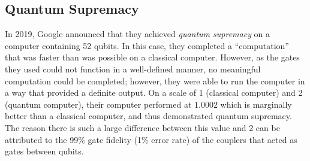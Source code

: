 \subsection{Quantum Supremacy}
In 2019, Google announced that they achieved \emph{quantum supremacy} on a computer containing 52 qubits. In this case, they completed a ``computation'' that was faster than was possible on a classical computer. However, as the gates they used could not function in a well-defined manner, no meaningful computation could be completed; however, they were able to run the computer in a way that provided a definite output. On a scale of 1 (classical computer) and 2 (quantum computer), their computer performed at \(1.0002\) which is marginally better than a classical computer, and thus demonstrated quantum supremacy. The reason there is such a large difference between this value and 2 can be attributed to the 99\% gate fidelity (1\% error rate) of the couplers that acted as gates between qubits.
